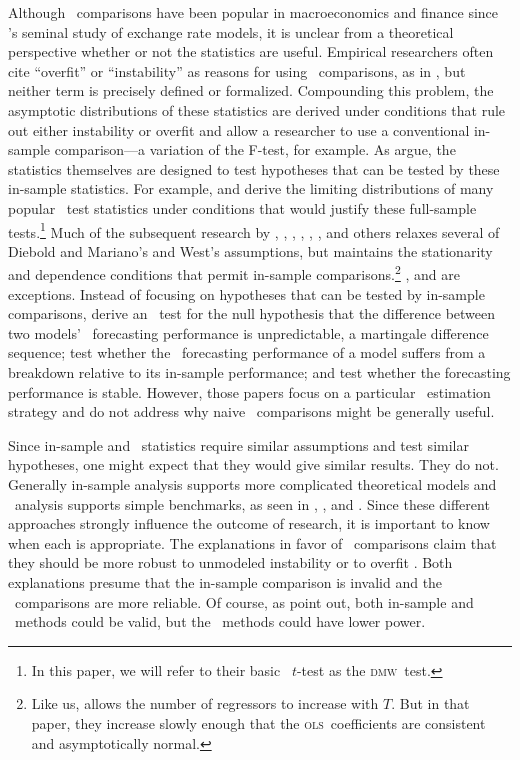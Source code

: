 \documentclass[11pt]{article}
\newcommand{\citepos}[1]{\citeauthor{#1}'s \citeyearpar{#1}}
\newcommand{\dmw}{\textsc{dmw}}
\newcommand{\ols}{\textsc{ols}}
\begin{document}
Although \oos\ comparisons have been popular in macroeconomics and
finance since \citepos{MeR:83} seminal study of exchange rate models,
it is unclear from a theoretical perspective whether or not the
statistics are useful.  Empirical researchers often cite ``overfit''
or ``instability'' as reasons for using \oos\ comparisons, as in
\citet{StW:03}, but neither term is precisely defined or formalized.
Compounding this problem, the asymptotic distributions of these
statistics are derived under conditions that rule out either
instability or overfit and allow a researcher to use a conventional
in-sample comparison---a variation of the F-test, for example.  As
\citet{InK:04} argue, the statistics themselves are designed to test
hypotheses that can be tested by these in-sample statistics.  For
example, \citet{DiM:95} and \citet{Wes:96} derive the limiting
distributions of many popular \oos\ test statistics under conditions
that would justify these full-sample tests.\footnote{In this paper, we
  will refer to their basic \oos\ $t$-test as the \dmw\ test.}  Much
of the subsequent research by \citet{Mcc:00, Mcc:07}, \citet{CCS:01},
\citet{ClM:01,ClM:05}, \citet{CoS:02,CoS:04}, \citet{ClW:06,ClW:07},
\citet{Ana:07}, and others relaxes several of Diebold and Mariano's
and West's assumptions, but maintains the stationarity and dependence
conditions that permit in-sample comparisons.\footnote{Like us,
  \citet{Ana:07} allows the number of regressors to increase with $T$.
  But in that paper, they increase slowly enough that the \ols\
  coefficients are consistent and asymptotically normal.}
\citet{GiW:06}, and \citet{GiR:09, GiR:10} are exceptions.  Instead of
focusing on hypotheses that can be tested by in-sample comparisons,
\citet{GiW:06} derive an \oos\ test for the null hypothesis that the
difference between two models' \oos\ forecasting performance is
unpredictable, a martingale difference sequence; \citet{GiR:09} test
whether the \oos\ forecasting performance of a model suffers from a
breakdown relative to its in-sample performance; and \citet{GiR:10}
test whether the forecasting performance is stable. However, those
papers focus on a particular \oos\ estimation strategy and do not
address why naive \oos\ comparisons might be generally useful.

Since in-sample and \oos\ statistics require similar assumptions and
test similar hypotheses, one might expect that they would give similar
results.  They do not.  Generally in-sample analysis supports more
complicated theoretical models and \oos\ analysis supports simple
benchmarks, as seen in \citet{MeR:83}, \citet{StW:03}, and
\citet{GoW:08}.  Since these different approaches strongly influence
the outcome of research, it is important to know when each is
appropriate.  The explanations in favor of \oos\ comparisons claim
that they should be more robust to unmodeled instability
\citep{ClM:05,GiW:06,GiR:09,GiR:10} or to overfit
\citep{Mcc:98,Cla:04}.  Both explanations presume that the in-sample
comparison is invalid and the \oos\ comparisons are more reliable.  Of
course, as \citet{InK:04,InK:06} point out, both in-sample and \oos\
methods could be valid, but the \oos\ methods could have lower power.
\end{document}
